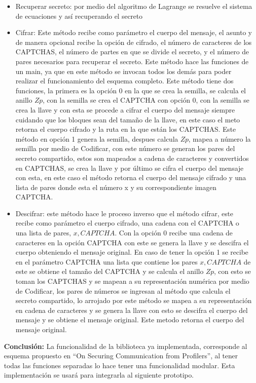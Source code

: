 \begin{itemize}
\item Recuperar secreto: por medio del algoritmo de Lagrange se resuelve el sistema de ecuaciones y así recuperando el secreto

\item Cifrar: Este método recibe como parámetro el cuerpo del mensaje, el asunto y de manera opcional recibe la opción de cifrado, el número de caracteres de los CAPTCHAS, el número de partes en que se divide el secreto, y el número de pares necesarios para recuperar el secreto.
Este método hace las funciones de un main, ya que en este método se invocan todos los demás para poder realizar el funcionamiento del esquema completo. Este método tiene dos funciones, la primera es la opción 0 en la que se crea la semilla, se calcula el anillo $Zp$, con la semilla se crea el CAPTCHA con opción 0, con la semilla se crea la llave y con esta se procede a cifrar el cuerpo del mensaje siempre cuidando que los bloques sean del tamaño de la llave, en este caso el meto retorna el cuerpo cifrado y la ruta en la que están los CAPTCHAS.
Este método en opción 1 genera la semilla, despues calcula $Zp$, mapea a número la semilla por medio de Codificar, con este número se generan los pares del secreto compartido, estos son mapeados a cadena de caracteres y convertidos en CAPTCHAS, se crea la llave y por último se cifra el cuerpo del mensaje con esta, en este caso el método retorna el cuerpo del mensaje cifrado y una lista de pares donde esta el número x y su correspondiente imagen CAPTCHA.

\item Descifrar: este método hace le proceso inverso que el método cifrar, este recibe como parámetro el cuerpo cifrado, una cadena con el CAPTCHA o una lista de pares, $x,CAPTCHA$.
Con la opción 0 recibe una cadena de caracteres en la opción CAPTCHA con este se genera la llave y se descifra el cuerpo obteniendo el mensaje original. En caso de tener la opción 1 se recibe en el parámetro CAPTCHA una lista que contiene los pares $x,CAPTCHA$
 de este se obtiene el tamaño del CAPTCHA y se calcula el anillo $Zp$, con esto se toman los CAPTCHAS y se mapean a su representación numérica por medio de Codificar, los pares de números se ingresan al método que calcula el secreto compartido, lo arrojado por este método se
 mapea a su representación en cadena de caracteres y se genera la llave con esto se descifra el cuerpo del mensaje y se obtiene el mensaje original. Este metodo retorna el cuerpo del mensaje original.

\end{itemize}
\textbf{Conclusión:} La funcionalidad de la biblioteca ya implementada, corresponde al esquema propuesto en “On Securing  Communication  from Profilers”, al tener todas las funciones separadas lo hace tener una funcionalidad modular. Esta implementación se usará para integrarla al siguiente prototipo.
\pagebreak
